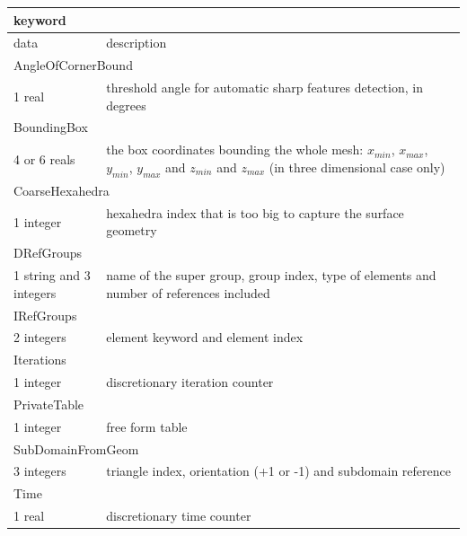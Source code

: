 \documentclass[a4paper,12pt]{article}
\begin{document}
\begin{tabular}{|m{4cm}|m{11cm}|}

\hline
\multicolumn{2}{|l|}{keyword} \\
\hline
data & description \\
\hline\hline

\multicolumn{2}{|l|}{AngleOfCornerBound} \\
\hline
1 real & threshold angle for automatic sharp features detection, in degrees\\
\hline\hline

\multicolumn{2}{|l|}{BoundingBox} \\
\hline
4 or 6 reals & the box coordinates bounding the whole mesh: $x_{min}$, $x_{max}$, $y_{min}$, $y_{max}$ and $z_{min}$ and $z_{max}$ (in three dimensional case only) \\
\hline\hline

\multicolumn{2}{|l|}{CoarseHexahedra} \\
\hline
1 integer & hexahedra index that is too big to capture the surface geometry \\
\hline\hline

\multicolumn{2}{|l|}{DRefGroups} \\
\hline
1 string and 3 integers & name of the super group, group index, type of elements and number of references included \\
\hline\hline

\multicolumn{2}{|l|}{IRefGroups} \\
\hline
2 integers & element keyword and element index \\
\hline\hline

\multicolumn{2}{|l|}{Iterations} \\
\hline
1 integer & discretionary iteration counter \\
\hline\hline

\multicolumn{2}{|l|}{PrivateTable} \\
\hline
1 integer & free form table \\
\hline

\multicolumn{2}{|l|}{SubDomainFromGeom} \\
\hline
3 integers & triangle index, orientation (+1 or -1) and subdomain reference \\
\hline

\multicolumn{2}{|l|}{Time} \\
\hline
1 real & discretionary time counter \\
\hline

\end{tabular}
\end{document}
